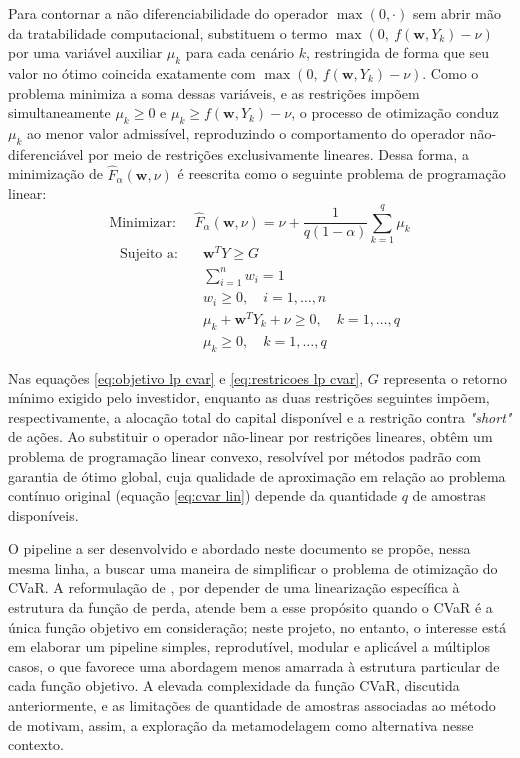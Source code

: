 \documentclass[12pt,a4paper]{article}
\begin{document}
Para contornar a não diferenciabilidade do operador $\max(0, \cdot)$ sem abrir mão da tratabilidade computacional,  substituem o termo $\max(0,\ f(\mathbf{w}, Y_k) - \nu)$ por uma variável auxiliar $\mu_k$ para cada cenário $k$, restringida de forma que seu valor no ótimo coincida exatamente com $\max(0,\ f(\mathbf{w}, Y_k) - \nu)$. Como o problema minimiza a soma dessas variáveis, e as restrições impõem simultaneamente $\mu_k \ge 0$ e $\mu_k \ge f(\mathbf{w}, Y_k) - \nu$, o processo de otimização conduz $\mu_k$ ao menor valor admissível, reproduzindo o comportamento do operador não-diferenciável por meio de restrições exclusivamente lineares. Dessa forma, a minimização de $\hat{F}_\alpha(\mathbf{w}, \nu)$ é reescrita como o seguinte problema de programação linear:
\begin{equation}
\text{Minimizar: } \quad \hat{F}_\alpha(\mathbf{w}, \nu) = \nu + \frac{1}{q(1-\alpha)}\sum_{k=1}^{q} \mu_k
\label{eq:objetivo lp cvar}
\end{equation}
\begin{equation}
\begin{aligned}
\text{Sujeito a:} \quad & \mathbf{w}^T Y \ge G \\
& \sum_{i=1}^{n} w_i = 1 \\
& w_i \ge 0, \quad i = 1, \ldots, n \\
& \mu_k + \mathbf{w}^T Y_k + \nu \ge 0, \quad k = 1, \ldots, q \\
& \mu_k \ge 0, \quad k = 1, \ldots, q
\end{aligned}
\label{eq:restricoes lp cvar}
\end{equation}

Nas equações \ref{eq:objetivo lp cvar} e \ref{eq:restricoes lp cvar}, $G$ representa o retorno mínimo exigido pelo investidor, enquanto as duas restrições seguintes impõem, respectivamente, a alocação total do capital disponível e a restrição contra \textit{"short"} de ações. Ao substituir o operador não-linear por restrições lineares,  obtêm um problema de programação linear convexo, resolvível por métodos padrão com garantia de ótimo global, cuja qualidade de aproximação em relação ao problema contínuo original (equação \ref{eq:cvar lin}) depende da quantidade $q$ de amostras disponíveis.

O pipeline a ser desenvolvido e abordado neste documento se propõe, nessa mesma linha, a buscar uma maneira de simplificar o problema de otimização do CVaR. A reformulação de , por depender de uma linearização específica à estrutura da função de perda, atende bem a esse propósito quando o CVaR é a única função objetivo em consideração; neste projeto, no entanto, o interesse está em elaborar um pipeline simples, reprodutível, modular e aplicável a múltiplos casos, o que favorece uma abordagem menos amarrada à estrutura particular de cada função objetivo. A elevada complexidade da função CVaR, discutida anteriormente, e as limitações de quantidade de amostras associadas ao método de  motivam, assim, a exploração da metamodelagem como alternativa nesse contexto.
\end{document}
